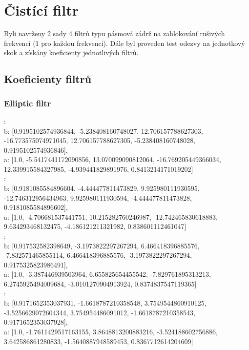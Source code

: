 \section{Čistící filtr}

Byli navrženy 2 sady 4 filtrů typu pásmová zádrž na zablokování rušivých frekvencí (1 pro každou frekvenci).
Dále byl proveden test odezvy na jednotkový skok a získány koeficienty jednotlivých filtrů.


\subsection{Koeficienty filtrů}

\subsubsection{Elliptic filtr}
:\\
b: [0.9195102574936844, -5.238408160748027, 12.706157788627303, -16.773575074971045, 12.706157788627305, -5.238408160748028, 0.9195102574936846],\\
a: [1.0, -5.5417441172090856, 13.070099090812064, -16.769205449366034, 12.339915584327985, -4.939441829891976, 0.8413214171019202]\\

:\\
b: [0.9181085584896604, -4.444477811473829, 9.925980111930595, -12.746312956434963, 9.925980111930594, -4.444477811473828, 0.9181085584896602],\\
a: [1.0, -4.706681537441751, 10.215282760246987, -12.742465830618883, 9.634293468132475, -4.186121211321982, 0.838601112461047]\\

:\\
b: [0.917532582398649, -3.1973822297267294, 6.466418396885576, -7.832571465855114, 6.466418396885576, -3.1973822297267294, 0.9175325823986491],\\
a: [1.0, -3.387446939503964, 6.655825654455542, -7.829761895313213, 6.2745925494009684, -3.0101270904913924, 0.8374837547119365]\\

:\\
b: [0.9171652353037931, -1.6618787210358548, 3.7549544860910125, -3.5256629072604344, 3.754954486091012, -1.6618787210358543, 0.9171652353037928],\\
a: [1.0, -1.7611429517163155, 3.8648813200883216, -3.524188602756886, 3.642586861280833, -1.5640887948589453, 0.8367712614204609]\\

